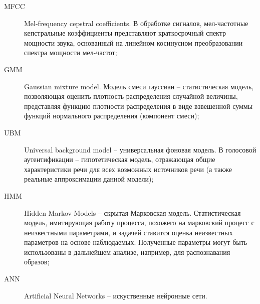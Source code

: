 \Abbreviations %
\begin{description}
\item[MFCC] Mel-frequency cepstral coefficients. В обработке сигналов, мел-частотные кепстральные коэффициенты представляют краткосрочный спектр мощности звука, основанный на линейном косинусном преобразовании спектра мощности мел-частот;
\item[GMM] Gaussian mixture model. Модель смеси гауссиан -- статистическая модель, позволяющая оценить плотность распределения случайной величины, представляя функцию плотности распределения в виде взвешенной суммы функций нормального распределения (компонент смеси);
\item[UBM] Universal background model -- универсальная фоновая модель. В голосовой аутентификации -- гипотетическая модель, отражающая общие характеристики речи для всех возможных источников речи (а также реальные аппроксимации данной модели);
\item[HMM] Hidden Markov Models -- скрытая Марковская модель. Статистическая модель, имитирующая работу процесса, похожего на марковский процесс с неизвестными параметрами, и задачей ставится оценка неизвестных параметров на основе наблюдаемых. Полученные параметры могут быть использованы в дальнейшем анализе, например, для распознавания образов;
\item[ANN] Artificial Neural Networks -- искуственные нейронные сети.
\end{description}

